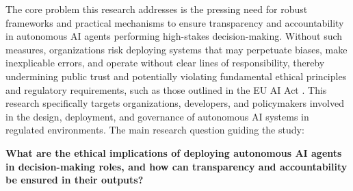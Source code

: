 \documentclass[english]{hogent-article}
\begin{document}
The core problem this research addresses is the pressing need for robust frameworks and practical mechanisms to ensure transparency and accountability in autonomous AI agents performing high-stakes decision-making. Without such measures, organizations risk deploying systems that may perpetuate biases, make inexplicable errors, and operate without clear lines of responsibility, thereby undermining public trust and potentially violating fundamental ethical principles and regulatory requirements, such as those outlined in the EU AI Act \autocite{EuropeanCommission2021AIAct}. This research specifically targets organizations, developers, and policymakers involved in the design, deployment, and governance of autonomous AI systems in regulated environments. The main research question guiding the study:

\textbf{What are the ethical implications of deploying autonomous AI agents in decision-making roles, and how can transparency and accountability be ensured in their outputs?}
\end{document}
